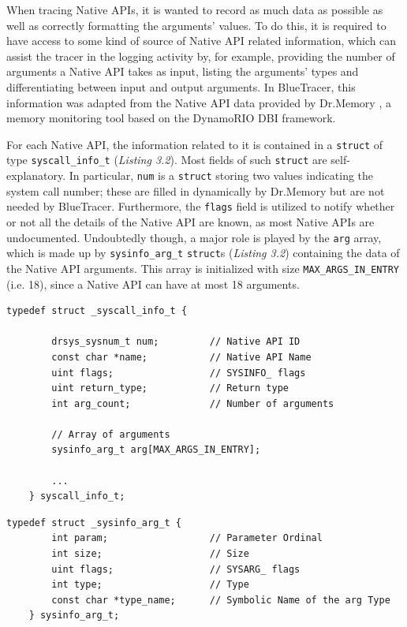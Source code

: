 When tracing Native APIs, it is wanted to record as much data as possible as well as correctly formatting the arguments' values. To do this, it is required to have access to some kind of source of Native API related information, which can assist the tracer in the logging activity by, for example, providing the number of arguments a Native API takes as input, listing the arguments' types and differentiating between input and output arguments.
In BlueTracer, this information was adapted from the Native API data provided by Dr.Memory \cite{DrMemory}, a memory monitoring tool based on the DynamoRIO DBI framework.

For each Native API, the information related to it is contained in a \texttt{struct} of type \texttt{syscall\_info\_t} (\textit{Listing 3.2}). Most fields of such \texttt{struct} are self-explanatory. In particular, \texttt{num} is a \texttt{struct} storing two values indicating the system call number; these are filled in dynamically by Dr.Memory but are not needed by BlueTracer. Furthermore, the \texttt{flags} field is utilized to notify whether or not all the details of the Native API are known, as most Native APIs are undocumented. Undoubtedly though, a major role is played by the \texttt{arg} array, which is made up by \texttt{sysinfo\_arg\_t} \texttt{struct}s (\textit{Listing 3.2}) containing the data of the Native API arguments. This array is initialized with size \texttt{MAX\_ARGS\_IN\_ENTRY} (i.e. 18), since a Native API can have at most 18 arguments. 
\\
\begin{lstlisting}[caption={\texttt{struct} containing Native API-related information},captionpos=b]
	typedef struct _syscall_info_t {

		drsys_sysnum_t num;			// Native API ID
		const char *name;			// Native API Name
		uint flags; 				// SYSINFO_ flags
		uint return_type; 			// Return type
		int arg_count;				// Number of arguments

		// Array of arguments
		sysinfo_arg_t arg[MAX_ARGS_IN_ENTRY];

		...
	} syscall_info_t;
\end{lstlisting}

\begin{lstlisting}[caption={\texttt{struct} containing information associated to a Native API argument},captionpos=b]
	typedef struct _sysinfo_arg_t {
		int param; 				    // Parameter Ordinal
		int size; 				    // Size
		uint flags; 				// SYSARG_ flags
		int type; 				    // Type
		const char *type_name; 	    // Symbolic Name of the arg Type
	} sysinfo_arg_t;
\end{lstlisting}

